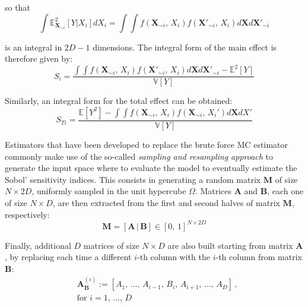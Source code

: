 \noindent
so that
%
\begin{equation}
    \int \mathbb{E}^2_{\mathbf{X}_{\sim i}}[Y|X_i]dX_i = \int\int f(\mathbf{X}_{\sim i},\, X_i)f(\mathbf{X'}_{\sim i},\, X_i)d\mathbf{X}d\mathbf{X'}_{\sim i}
\end{equation}

\noindent
is an integral in $2D - 1$ dimensions. The integral form of the main effect is therefore given by:
%
\begin{equation}\label{eq:mainintform}
    S_{i} = \frac{\int\int f(\mathbf{X}_{\sim i},\, X_i)f(\mathbf{X'}_{\sim i},\, X_i)d\mathbf{X}d\mathbf{X'}_{\sim i} - \mathbb{E}^2[Y]}{\mathbb{V}[Y]}
\end{equation}

\noindent
Similarly, an integral form for the total effect can be obtained:
%
\begin{equation}\label{eq:totalintform}
    S_{Ti} = \frac{\mathbb{E}[Y^2] - \int\int f(\mathbf{X}_{\sim i},\, X_i)f(\mathbf{X}_{\sim i},\, X_i')d\mathbf{X}dX'}{\mathbb{V}[Y]}
\end{equation}

\vspace{0.2cm}
Estimators that have been developed to replace the brute force MC estimator commonly make use of the so-called \textit{sampling and resampling approach} to generate the input space where to evaluate the model to eventually estimate the Sobol' sensitivity indices. This consists in generating a random matrix $\mathbf{M}$ of size $N\times 2D$, uniformly sampled in the unit hypercube $\Omega$. Matrices $\mathbf{A}$ and $\mathbf{B}$, each one of size $N\times D$, are then extracted from the first and second halves of matrix $\mathbf{M}$, respectively:
%
\begin{equation}
    \mathbf{M} =  [\mathbf{A}\,|\,\mathbf{B}]\in [0,\,1]^{N\times 2D}
\end{equation}

\noindent
Finally, additional $D$ matrices of size $N\times D$ are also built starting from matrix $\mathbf{A}$, by replacing each time a different $i$-th column with the $i$-th column from matrix $\mathbf{B}$:
%
\begin{align}
    & \mathbf{A}_{\mathbf{B}}^{(i)} := [A_1,\,\dots,\,A_{i-1},\,B_i,\,A_{i+1},\,\dots,\,A_{D}]\,, \\
    & \text{for}\,\,i=1,\,\dots,\,D
\end{align}

